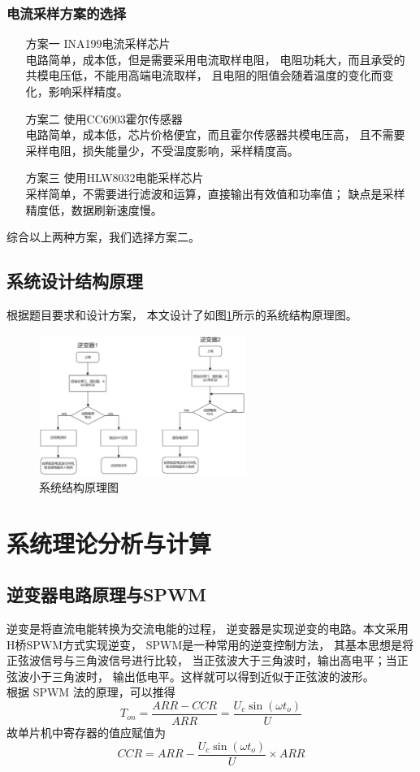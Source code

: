 \documentclass[a4paper,12pt]{article}
\begin{document}
\subsubsection{电流采样方案的选择}
\begin{enumerate}
    \item[方案一] INA199电流采样芯片 
    \\ 
    电路简单，成本低，但是需要采用电流取样电阻，
    电阻功耗大，而且承受的共模电压低，不能用高端电流取样，
    且电阻的阻值会随着温度的变化而变化，影响采样精度。
    \item[方案二] 使用CC6903霍尔传感器 
    \\ 
    电路简单，成本低，芯片价格便宜，而且霍尔传感器共模电压高，
    且不需要采样电阻，损失能量少，不受温度影响，采样精度高。
    \item[方案三] 使用HLW8032电能采样芯片  
    \\
    采样简单，不需要进行滤波和运算，直接输出有效值和功率值；
    缺点是采样精度低，数据刷新速度慢。
\end{enumerate}
综合以上两种方案，我们选择方案二。

\subsection{系统设计结构原理}
根据题目要求和设计方案，
本文设计了如图\ref{fig2}所示的系统结构原理图。
\begin{figure}[htbp]
\centering
\includegraphics[width=0.6\textwidth]{src/fig.png}
\caption{系统结构原理图}
\label{fig2}
\end{figure}


\section{系统理论分析与计算}
\subsection{逆变器电路原理与SPWM}
逆变是将直流电能转换为交流电能的过程，
逆变器是实现逆变的电路。本文采用H桥SPWM方式实现逆变，
SPWM是一种常用的逆变控制方法，
其基本思想是将正弦波信号与三角波信号进行比较，
当正弦波大于三角波时，输出高电平；当正弦波小于三角波时，
输出低电平。这样就可以得到近似于正弦波的波形。
\\
根据 SPWM 法的原理，可以推得
\begin{equation*}
T_{on}=\frac{ARR-CCR}{ARR}=\frac{U_c\sin(\omega t_o)}{U}
\end{equation*}
故单片机中寄存器的值应赋值为
\begin{equation*}
CCR=ARR-\frac{U_c\sin (\omega t_o)}{U}\times ARR
\end{equation*}
\end{document}
